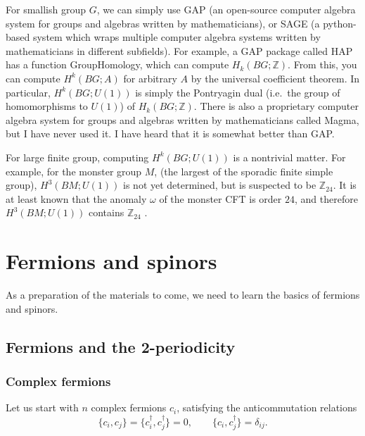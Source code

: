 \documentclass[12pt]{article}
\numberwithin{equation}{section}
\numberwithin{figure}{section}
\theoremstyle{remark}
\def\bZ{\mathbb{Z}}
\begin{document}
For smallish group $G$, we can simply use GAP (an open-source computer algebra system 
for groups and algebras written by mathematicians), or SAGE (a python-based system
which wraps multiple computer algebra systems written by mathematicians in different subfields).
For example, a GAP package called HAP has a function GroupHomology,
which can compute $H_k(BG;\bZ)$. 
From this, you can compute $H^k(BG;A)$ for arbitrary $A$ by the universal coefficient theorem.
In particular, $H^k(BG;U(1))$ is simply the Pontryagin dual (i.e.~the group of
homomorphisms to $U(1)$) of $H_k(BG;\bZ)$.
There is also a proprietary computer algebra system for groups and algebras 
written by mathematicians called Magma, but I have never used it.
I have heard that it is somewhat better than GAP.

For large finite group, computing $H^k(BG;U(1))$ is a nontrivial matter.
For example, for the monster group $M$, (the largest of the sporadic finite simple group),
$H^3(BM;U(1))$ is not yet determined, but is suspected to be $\bZ_{24}$.
It is at least known that the anomaly $\omega$ 
of the monster CFT is order $24$, and therefore $H^3(BM;U(1))$ contains $\bZ_{24}$ \cite{Johnson-Freyd:2017ble}.

\goodbreak

\section{Fermions and spinors}

As a preparation of the materials to come, we need to learn the basics of 
fermions and spinors.

\subsection{Fermions and the 2-periodicity}
\subsubsection{Complex fermions}
Let us start with $n$ complex fermions $c_i$, satisfying the anticommutation relations \begin{equation}
\{c_i , c_j\}=\{c_i^\dagger,c_j^\dagger\}=0,\qquad
\{c_i,c_j^\dagger\}=\delta_{ij}.
\end{equation}
\end{document}
